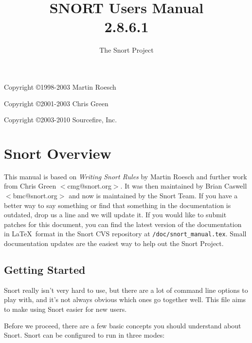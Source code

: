 \documentclass[english]{report}
\begin{document}
\title{SNORT\textsuperscript{\textregistered} Users Manual\\2.8.6.1}

\author{The Snort Project}

\maketitle

\newpage

Copyright \copyright 1998-2003 Martin Roesch

Copyright \copyright 2001-2003 Chris Green

Copyright \copyright 2003-2010 Sourcefire, Inc.

\tableofcontents{}

\chapter{Snort Overview}

This manual is based on \emph{Writing Snort Rules} by Martin Roesch and further
work from Chris Green $<$cmg@snort.org$>$.  It was then maintained by Brian
Caswell $<$bmc@snort.org$>$ and now is maintained by the Snort Team.  If you
have a better way to say something or find that something in the documentation
is outdated, drop us a line and we will update it.  If you would like to submit
patches for this document, you can find the latest version of the documentation
in \LaTeX\ format in the Snort CVS repository at \verb!/doc/snort_manual.tex!.
Small documentation updates are the easiest way to help out the Snort Project.

\section{Getting Started}

Snort really isn't very hard to use, but there are a lot of command line
options to play with, and it's not always obvious which ones go together well.
This file aims to make using Snort easier for new users.

Before we proceed, there are a few basic concepts you should understand about
Snort. Snort can be configured to run in three modes:
\end{document}
